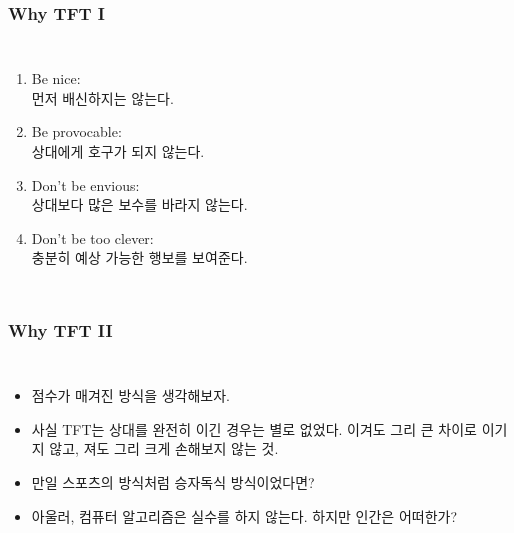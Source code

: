 \documentclass[final]{beamer}
\begin{document}
\begin{frame}\frametitle{Why TFT I}\vspace{1em}
\begin{columns}[c]
\column{17em}
\begin{enumerate}
\item Be nice:\\먼저 배신하지는 않는다. 
\item Be provocable: \\상대에게 호구가 되지 않는다. 
\item Don't be envious: \\상대보다 많은 보수를 바라지 않는다. 
\item Don't be too clever:\\충분히 예상 가능한 행보를 보여준다. 
\end{enumerate}
\column{13em}
\hspace{-1em}
\end{columns}
\end{frame}

\begin{frame}\frametitle{Why TFT II}\vspace{1em}
\begin{columns}[c]
\column{17em}
\begin{itemize}
\item 점수가 매겨진 방식을 생각해보자.  
\item 사실 TFT는 상대를 완전히 이긴 경우는 별로 없었다. 이겨도 그리 큰 차이로 이기지 않고, 져도 그리 크게 손해보지 않는 것. 
\item 만일 스포츠의 방식처럼 승자독식 방식이었다면?  
\item 아울러, 컴퓨터 알고리즘은 실수를 하지 않는다. 하지만 인간은 어떠한가? 
\end{itemize}
\column{13em}
\hspace{-1em}
\end{columns}
\end{frame}
\end{document}
